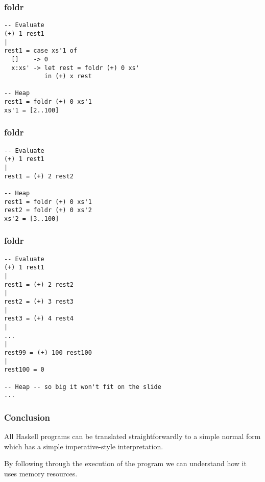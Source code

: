 \documentclass{beamer}
\begin{document}
\begin{frame}[t,fragile]
\frametitle{foldr}
\begin{verbatim}
-- Evaluate
(+) 1 rest1
|
rest1 = case xs'1 of
  []    -> 0
  x:xs' -> let rest = foldr (+) 0 xs'
           in (+) x rest

-- Heap
rest1 = foldr (+) 0 xs'1
xs'1 = [2..100]
\end{verbatim}
\end{frame}

\begin{frame}[t,fragile]
\frametitle{foldr}
\begin{verbatim}
-- Evaluate
(+) 1 rest1
|
rest1 = (+) 2 rest2

-- Heap
rest1 = foldr (+) 0 xs'1
rest2 = foldr (+) 0 xs'2
xs'2 = [3..100]
\end{verbatim}
\end{frame}

\begin{frame}[t,fragile]
\frametitle{foldr}
\begin{verbatim}
-- Evaluate
(+) 1 rest1
|
rest1 = (+) 2 rest2
|
rest2 = (+) 3 rest3
|
rest3 = (+) 4 rest4
|
...
|
rest99 = (+) 100 rest100
|
rest100 = 0

-- Heap -- so big it won't fit on the slide
...
\end{verbatim}
\end{frame}

\begin{frame}[fragile]
\frametitle{Conclusion}
All Haskell programs can be translated straightforwardly to a
simple normal form which has a simple imperative-style
interpretation.

By following through the execution of the program we can understand
how it uses memory resources.
\end{frame}
\end{document}
